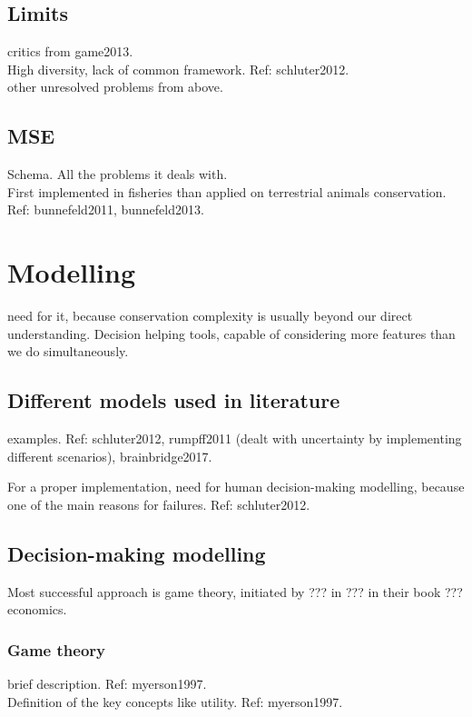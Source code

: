 \documentclass[12pt,a4paper]{article}
\begin{document}
\subsection{Limits}

critics from game2013.\\
High diversity, lack of common framework. Ref: schluter2012.\\
other unresolved problems from above.

\subsection{MSE}

Schema.
All the problems it deals with. \\
First implemented in fisheries than applied on terrestrial animals conservation. Ref: bunnefeld2011, bunnefeld2013.\\

\section{Modelling}

need for it, because conservation complexity is usually beyond our direct understanding. Decision helping tools, capable of considering more features than we do simultaneously.

\subsection{Different models used in literature}

examples. Ref: schluter2012, rumpff2011 (dealt with uncertainty by implementing different scenarios), brainbridge2017.

For a proper implementation, need for human decision-making modelling, because one of the main reasons for failures. Ref: schluter2012.

\subsection{Decision-making modelling}

Most successful approach is game theory, initiated by ??? in ??? in their book ??? economics.

\subsubsection{Game theory}
brief description. Ref: myerson1997.\\
Definition of the key concepts like utility. Ref: myerson1997.
\end{document}
